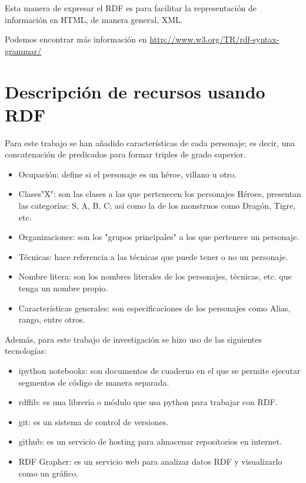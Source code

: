 \documentclass[conference]{IEEEtran}
\begin{document}
Esta manera de expresar el RDF es para facilitar la representación de información en HTML, de manera general, XML.

Podemos encontrar más información en \url{http://www.w3.org/TR/rdf-syntax-grammar/} \cite{b8}


\section{Descripción de recursos usando RDF}

Para este trabajo se han añadido características de cada personaje; es decir, una concatenación de predicados para formar triples de grado superior.

\begin{itemize}
    \item Ocupación: define si el personaje es un héroe, villano u otro.
    \item Clases"X": son las clases a las que pertenecen los personajes Héroes, presentan las categorías: S, A, B, C; así como la de los monstruos como Dragón, Tigre, etc.
    \item Organizaciones: son los "grupos principales" a los que pertenece un personaje.
    \item Técnicas: hace referencia a las técnicas que puede tener o no un personaje.
    \item Nombre litera: son los nombres literales de los personajes, técnicas, etc. que tenga un nombre propio.
    \item Características generales: son especificaciones de los personajes como Alias, rango, entre otros.
\end{itemize}

Además, para este trabajo de investigación se hizo uso de las siguientes tecnologías:

\begin{itemize}
    \item ipython notebooks: son documentos de cuaderno en el que se permite ejecutar segmentos de código de manera separada.
    \item rdflib: es una librería o módulo que usa python para trabajar con RDF.
    \item git: es un sistema de control de versiones.
    \item github: es un servicio de hosting para almacenar repositorios en internet.
    \item RDF Grapher: es un servicio web para analizar datos RDF y visualizarlo como un gráfico.
\end{itemize}
\end{document}
